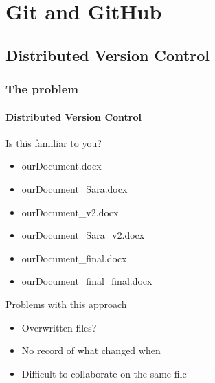 \documentclass[aspectratio=169,dvipsnames]{beamer}
\begin{document}
\appendix
\section{Git and GitHub}
\subsection{Distributed Version Control}
\begin{frame}
    \frametitle{The problem}
    \framesubtitle{Distributed Version Control}

    \begin{minipage}{0.5\textwidth}
        \begin{block}{Is this familiar to you?}
            \begin{itemize}
                \small
                \item ourDocument.docx \pause
                \item ourDocument\_Sara.docx \pause
                \item ourDocument\_v2.docx \pause
                \item ourDocument\_Sara\_v2.docx \pause
                \item ourDocument\_final.docx \pause
                \item ourDocument\_final\_final.docx \pause
            \end{itemize}
        \end{block}
    \end{minipage}
    \begin{minipage}{0.49\textwidth}
        \begin{block}{Problems with this approach}
            \begin{itemize}
                \small
                \item Overwritten files?
                \item No record of what changed when 
                \item Difficult to collaborate on the same file
            \end{itemize}
        \end{block}
    \end{minipage}
\end{frame}
\end{document}
